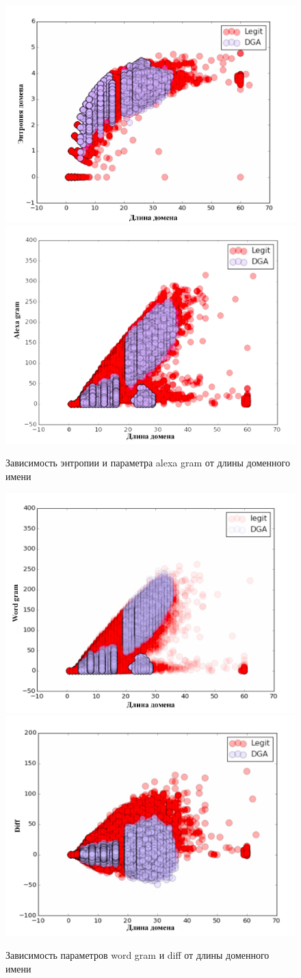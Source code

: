    \begin{figure}[H]
        \left
        \includegraphics[width=0.5\linewidth]{images/linear_class/entropy2.png}
        \right
        \includegraphics[width=0.5\linewidth]{images/linear_class/alexa_gramm.png}
        \caption{Зависимость энтропии и параметра alexa gram от длины доменного имени} \label{entropy_alexa}
    \end{figure}
    \begin{figure}[H]
        \left
        \includegraphics[width=0.5\linewidth]{images/linear_class/word_gramm.png}
        \right
        \includegraphics[width=0.5\linewidth]{images/linear_class/diff.png}
        \caption{Зависимость параметров word gram и diff от длины доменного имени} \label{word_gram_diff}
    \end{figure}
